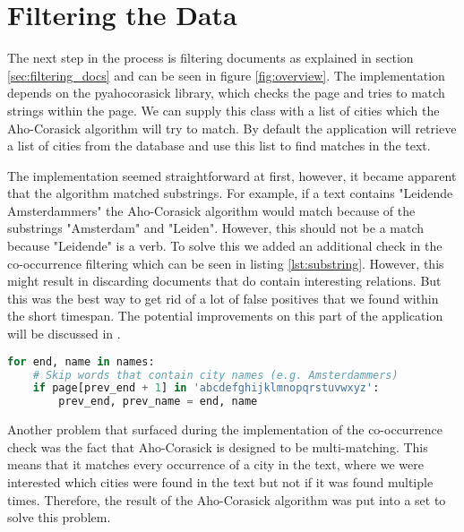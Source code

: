 \section{Filtering the Data}\label{sec:5-filtering}
The next step in the process is filtering documents as explained in section \ref{sec:filtering_docs} and can be seen in figure \ref{fig:overview}. The implementation depends on the pyahocorasick library, which checks the page and tries to match strings within the page. We can supply this class with a list of cities which the Aho-Corasick algorithm will try to match. By default the application will retrieve a list of cities from the database and use this list to find matches in the text.

The implementation seemed straightforward at first, however, it became apparent that the algorithm matched substrings. For example, if a text contains "Leidende Amsterdammers" the Aho-Corasick algorithm would match because of the substrings "Amsterdam" and "Leiden". However, this should not be a match because "Leidende" is a verb. To solve this we added an additional check in the co-occurrence filtering which can be seen in listing \ref{lst:substring}. However, this might result in discarding documents that do contain interesting relations. But this was the best way to get rid of a lot of false positives that we found within the short timespan. The  potential improvements on this part of the application will be discussed in .

\begin{lstlisting}[language=Python, caption=Additional check to prevent substring matches, label={lst:substring}]
for end, name in names:
    # Skip words that contain city names (e.g. Amsterdammers)
    if page[prev_end + 1] in 'abcdefghijklmnopqrstuvwxyz':
        prev_end, prev_name = end, name
\end{lstlisting}

Another problem that surfaced during the implementation of the co-occurrence check was the fact that Aho-Corasick is designed to be multi-matching. This means that it matches every occurrence of a city in the text, where we were interested which cities were found in the text but not if it was found multiple times. Therefore, the result of the Aho-Corasick algorithm was put into a set to solve this problem.
